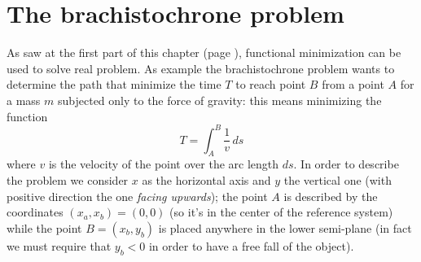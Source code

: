 \section{The brachistochrone problem}
	As saw at the first part of this chapter (page \pageref{sec:chfunctional}), functional minimization can be used to solve real problem. As example the brachistochrone problem wants to determine the path that minimize the time $T$ to reach point $B$ from a point $A$ for a mass $m$ subjected only to the force of gravity: this means minimizing the function
	\[ T = \int_A^B \frac 1 v \, ds \]
	where $v$ is the velocity of the point over the arc length $ds$. In order to describe the problem we consider $x$ as the horizontal axis and $y$ the vertical one (with positive direction the one \textit{facing upwards}); the point $A$ is described by the coordinates $(x_a,x_b) = (0,0)$ (so it's in the center of the reference system) while the point $B = (x_b,y_b)$ is placed anywhere in the lower semi-plane (in fact we must require that $y_b<0$ in order to have a free fall of the object). 
	
